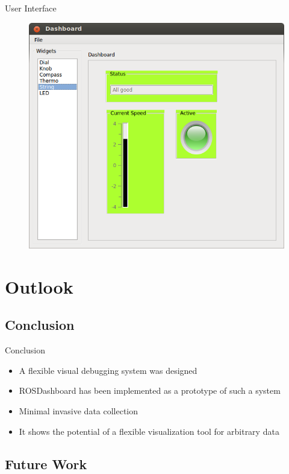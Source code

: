 \documentclass[compress]{beamer}
\begin{document}
\begin{frame}{User Interface}
\begin{figure}[t]
    \centering
    \includegraphics[height=.7\textheight]{images/rosdashboard_screenshot.png}
\end{figure}
\end{frame}

\section{Outlook}

\subsection{Conclusion}

\begin{frame}{Conclusion}
\begin{itemize}
\item A flexible visual debugging system was designed
\item ROSDashboard has been implemented as a prototype of such a system
\item Minimal invasive data collection
\item It shows the potential of a flexible visualization tool for arbitrary data
\end{itemize}
\end{frame}

\subsection{Future Work}
\end{document}
